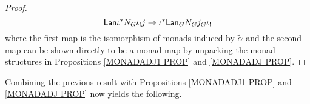 \documentclass[a4paper,10pt
,draft
]{article}%
\numberwithin{equation}{section}
\numberwithin{figure}{section}
\theoremstyle{definition} %
\newcommand{\Fin}{\mathsf{F}}%
\newcommand{\1}{\ensuremath{\mathbbm 1}}%
\begin{document}
\begin{proof}
\[	\mathsf{Lan} \iota^{\**} N_G \iota_! j  \to
	\iota^{\**} \mathsf{Lan}_G  N_G  j_G \iota_!
\]
where the first map is the isomorphism of monads induced by $\tilde{\alpha}$ and the second map can be shown directly to be a monad map by unpacking the monad structures in 
Propositions \ref{MONADADJ1 PROP} and \ref{MONADADJ PROP}.
\end{proof}

Combining the previous result with
Propositions \ref{MONADADJ1 PROP} and \ref{MONADADJ PROP} now yields the following.
\end{document}
